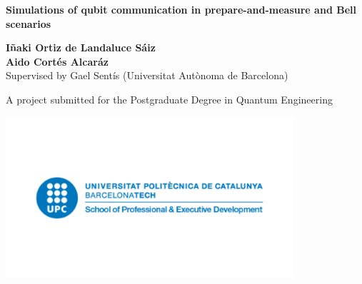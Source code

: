 \begin{titlepage}
   \begin{center}
       \vspace*{1cm}

       \Large
       \textbf{Simulations of qubit communication in prepare-and-measure and Bell scenarios}

       \vspace{0.8cm}

       \normalsize
       \textbf{I\~{n}aki Ortiz de Landaluce S\'aiz\\Aido Cort\'es Alcar\'az\\}
       \vspace{0.5cm}
       \footnotesize{Supervised by Gael Sent\'is (Universitat Aut\`onoma de Barcelona)}
       \vfill
            
       \footnotesize{A project submitted for the Postgraduate Degree in Quantum Engineering}
            
       \includegraphics[width=0.8\textwidth]{images/upc.png}
            
       \date{\today}
            
   \end{center}
\end{titlepage}